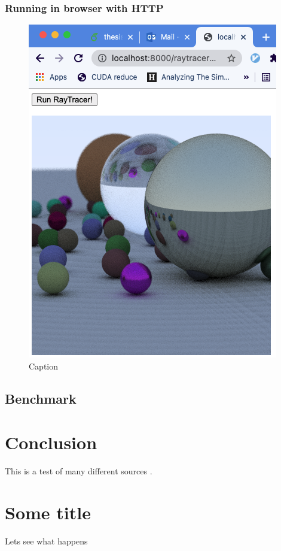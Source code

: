 \documentclass[11pt]{book}
\begin{document}
\subsection{Running in browser with HTTP}




\begin{figure}[htbp]
    \centering
    \includegraphics[scale=0.6]{figures/raytracer.png}
    \caption{Caption}
    \label{fig:mandelbrot}
\end{figure}

\section{Benchmark}
\chapter{Conclusion}
This is a test\cite{albers2010a} of \cite{bodie2019a} many \cite{kim2015a} different \cite{tsukagoshi2015a} sources \cite{pixhawk_history}.


\appendix
\chapter{Some title}
Lets see what happens



\printbibliography[heading=bibintoc]
\end{document}

